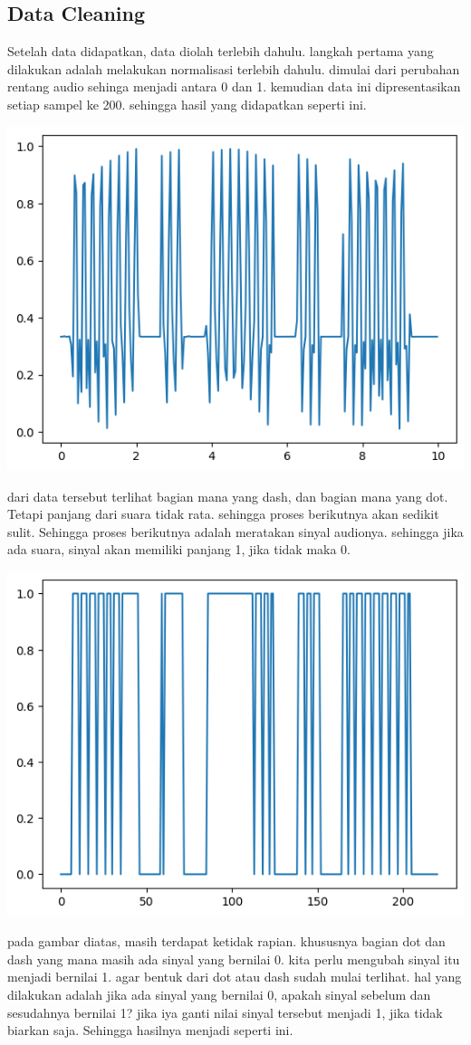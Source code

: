 \documentclass[]{article}
\begin{document}
\subsection{Data Cleaning}
Setelah data didapatkan, data diolah terlebih dahulu. langkah pertama yang dilakukan adalah melakukan normalisasi terlebih dahulu. dimulai dari perubahan rentang audio sehinga menjadi antara 0 dan 1. kemudian data ini dipresentasikan setiap sampel ke 200. sehingga hasil yang didapatkan seperti ini.
\begin{center}
	\includegraphics[width=0.7\linewidth]{img/screenshot005}
\end{center}
dari data tersebut terlihat bagian mana yang dash, dan bagian mana yang dot. Tetapi panjang dari suara tidak rata. sehingga proses berikutnya akan sedikit sulit. Sehingga proses berikutnya adalah meratakan sinyal audionya. sehingga jika ada suara, sinyal akan memiliki panjang 1, jika tidak maka 0.
\begin{center}
	\includegraphics[width=0.7\linewidth]{img/screenshot004}
\end{center}
pada gambar diatas, masih terdapat ketidak rapian. khususnya bagian dot dan dash yang mana masih ada sinyal yang bernilai 0. kita perlu mengubah sinyal itu menjadi bernilai 1. agar bentuk dari dot atau dash sudah mulai terlihat. hal yang dilakukan adalah jika ada sinyal yang bernilai 0, apakah sinyal sebelum dan sesudahnya bernilai 1? jika iya ganti nilai sinyal tersebut menjadi 1, jika tidak biarkan saja. Sehingga hasilnya menjadi seperti ini.
\end{document}

